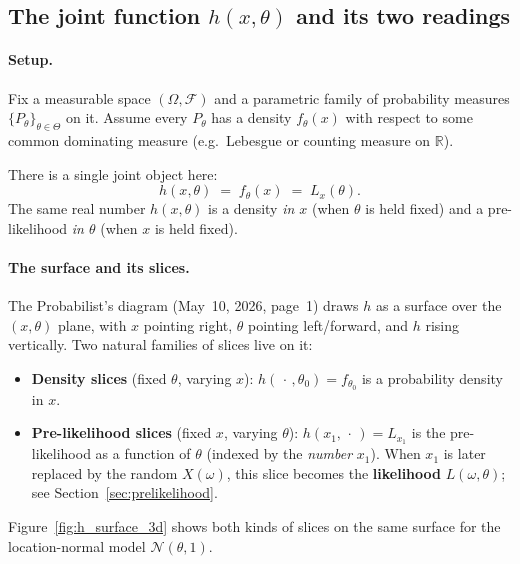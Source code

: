 \documentclass[a4paper,oneside,12pt]{extarticle}
\theoremstyle{plain}
\theoremstyle{definition}
\theoremstyle{remark}
\begin{document}
\subsection{The joint function $h(x,\theta)$ and its two readings}
\label{sec:h_joint}

\paragraph{Setup.}
Fix a measurable space $(\Omega, \mathcal{F})$ and a parametric family
of probability measures $\{P_\theta\}_{\theta\in\Theta}$ on it.
Assume every $P_\theta$ has a density $f_\theta(x)$ with respect to
some common dominating measure (e.g.\ Lebesgue or counting measure
on $\mathbb{R}$).

There is a single joint object here:
\[
  h(x,\theta) \;=\; f_\theta(x) \;=\; L_x(\theta).
\]
The same real number $h(x,\theta)$ is a density \emph{in $x$}
(when $\theta$ is held fixed) and a pre-likelihood \emph{in $\theta$}
(when $x$ is held fixed).

\paragraph{The surface and its slices.}
The Probabilist's diagram (May~10, 2026, page~1) draws $h$ as a surface over
the $(x,\theta)$ plane, with $x$ pointing right, $\theta$ pointing
left/forward, and $h$ rising vertically.  Two natural families of
slices live on it:

\begin{itemize}
\item \textbf{Density slices} (fixed $\theta$, varying $x$):
  $h(\,\cdot\,,\theta_0) = f_{\theta_0}$ is a probability density in $x$.
\item \textbf{Pre-likelihood slices} (fixed $x$, varying $\theta$):
  $h(x_1,\,\cdot\,) = L_{x_1}$ is the pre-likelihood as a function of
  $\theta$ (indexed by the \emph{number} $x_1$).  When $x_1$ is later
  replaced by the random $X(\omega)$, this slice becomes the
  \textbf{likelihood} $L(\omega,\theta)$; see
  Section~\ref{sec:prelikelihood}.
\end{itemize}

Figure~\ref{fig:h_surface_3d} shows both kinds of slices on the same
surface for the location-normal model $\mathcal{N}(\theta,1)$.
\end{document}
